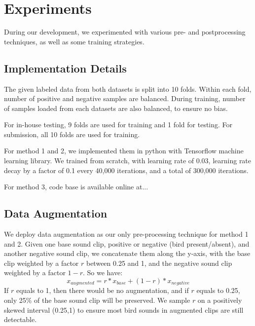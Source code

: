 \documentclass[10pt,twocolumn,letterpaper]{article}
\begin{document}
\section{Experiments}

During our development, we experimented with various pre- and
postprocessing techniques, as well as some training strategies.

\subsection{Implementation Details}

The given labeled data from both datasets is split into 10 folds. Within
each fold, number of positive and negative samples are balanced. During
training, number of samples loaded from each datasets are also balanced, to
ensure no bias.

For in-house testing, 9 folds are used for training and 1 fold for testing.
For submission, all 10 folds are used for training.

For method 1 and 2, we implemented them in python with Tensorflow machine
learning library. We trained from scratch, with learning rate of 0.03,
learning rate decay by a factor of 0.1 every 40,000 iterations, and a total
of 300,000 iterations.

For method 3, code base is available online at...


\subsection{Data Augmentation}

We deploy data augmentation as our only pre-processing technique for method
1 and 2. Given one base sound clip, positive or negative (bird
present/absent), and another negative sound clip, we concatenate them along
the y-axis, with the base clip weighted by a factor \(r\) between 0.25 and
1, and the negative sound clip weighted by a factor \(1-r\). So we have:
\begin{equation}
	x_{augmented}=r*x_{base} + (1-r)*x_{negative}
\end{equation}
If \(r\) equals to 1, then there would be no augmentation, and if \(r\)
equals to 0.25, only 25\% of the base sound clip will be preserved. We
sample \(r\) on a positively skewed interval (0.25,1) to ensure most bird
sounds in augmented clips are still detectable.
\end{document}
